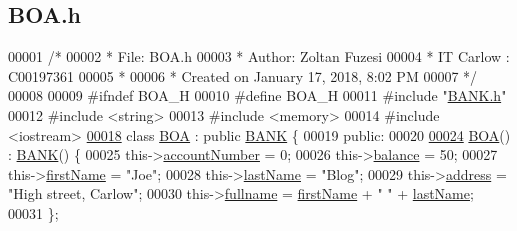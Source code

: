 \hypertarget{_b_o_a_8h_source}{}\subsection{B\+O\+A.\+h}

\begin{DoxyCode}
00001 \textcolor{comment}{/* }
00002 \textcolor{comment}{ * File:   BOA.h}
00003 \textcolor{comment}{ * Author: Zoltan Fuzesi}
00004 \textcolor{comment}{ * IT Carlow : C00197361}
00005 \textcolor{comment}{ *}
00006 \textcolor{comment}{ * Created on January 17, 2018, 8:02 PM}
00007 \textcolor{comment}{ */}
00008 
00009 \textcolor{preprocessor}{#ifndef BOA\_H}
00010 \textcolor{preprocessor}{#define BOA\_H}
00011 \textcolor{preprocessor}{#include "\hyperlink{_b_a_n_k_8h}{BANK.h}"}
00012 \textcolor{preprocessor}{#include <string>}
00013 \textcolor{preprocessor}{#include <memory>}
00014 \textcolor{preprocessor}{#include <iostream>}
\hypertarget{_b_o_a_8h_source.tex_l00018}{}\hyperlink{class_b_o_a}{00018} \textcolor{keyword}{class }\hyperlink{class_b_o_a}{BOA} : \textcolor{keyword}{public} \hyperlink{class_b_a_n_k}{BANK} \{
00019 \textcolor{keyword}{public}:
00020 
\hypertarget{_b_o_a_8h_source.tex_l00024}{}\hyperlink{class_b_o_a_ad42dc670d422172c9bcf9b3d354c8a3c_ad42dc670d422172c9bcf9b3d354c8a3c}{00024}     \hyperlink{class_b_o_a_ad42dc670d422172c9bcf9b3d354c8a3c_ad42dc670d422172c9bcf9b3d354c8a3c}{BOA}() : \hyperlink{class_b_a_n_k}{BANK}() \{
00025         this->\hyperlink{class_b_o_a_a86ca4ad716db205f04c337b39b34d9ba_a86ca4ad716db205f04c337b39b34d9ba}{accountNumber} = 0;
00026         this->\hyperlink{class_b_o_a_a2061c36a15924de9186ec5c83dc7da2f_a2061c36a15924de9186ec5c83dc7da2f}{balance} = 50;
00027         this->\hyperlink{class_b_o_a_acb1b3b2a69e403c4e0e3fb08fdbb52a0_acb1b3b2a69e403c4e0e3fb08fdbb52a0}{firstName} = \textcolor{stringliteral}{"Joe"};
00028         this->\hyperlink{class_b_o_a_ab7749e6e945beaca57a3ef01259c6fea_ab7749e6e945beaca57a3ef01259c6fea}{lastName} = \textcolor{stringliteral}{"Blog"};
00029         this->\hyperlink{class_b_o_a_afb2d7d0c5c05169a72bbc6f1d2cc737f_afb2d7d0c5c05169a72bbc6f1d2cc737f}{address} = \textcolor{stringliteral}{"High street, Carlow"};
00030         this->\hyperlink{class_b_o_a_aed3225e383c08b1b7c962a0e43b180d1_aed3225e383c08b1b7c962a0e43b180d1}{fullname} = \hyperlink{class_b_o_a_acb1b3b2a69e403c4e0e3fb08fdbb52a0_acb1b3b2a69e403c4e0e3fb08fdbb52a0}{firstName} + \textcolor{stringliteral}{" "} + \hyperlink{class_b_o_a_ab7749e6e945beaca57a3ef01259c6fea_ab7749e6e945beaca57a3ef01259c6fea}{lastName};
00031     \};

\end{DoxyCode}
